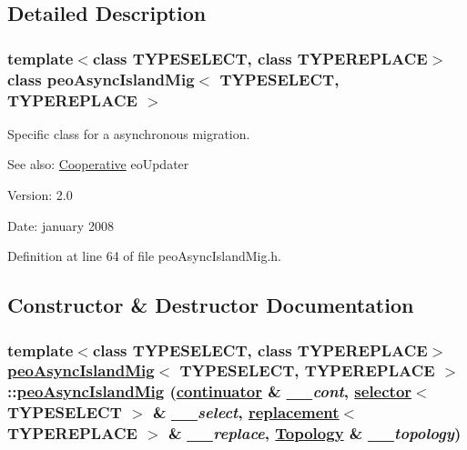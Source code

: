 \subsection{Detailed Description}
\subsubsection*{template$<$class TYPESELECT, class TYPEREPLACE$>$ class peo\-Async\-Island\-Mig$<$ TYPESELECT, TYPEREPLACE $>$}

Specific class for a asynchronous migration. 

\begin{Desc}
\item[See also:]\hyperlink{classCooperative}{Cooperative} eo\-Updater \end{Desc}
\begin{Desc}
\item[Version:]2.0 \end{Desc}
\begin{Desc}
\item[Date:]january 2008 \end{Desc}




Definition at line 64 of file peo\-Async\-Island\-Mig.h.

\subsection{Constructor \& Destructor Documentation}
\hypertarget{classpeoAsyncIslandMig_e40ddd54734b018ab4e5c3f2bbd5a49c}{
\subsubsection[peoAsyncIslandMig]{\setlength{\rightskip}{0pt plus 5cm}template$<$class TYPESELECT, class TYPEREPLACE$>$ \hyperlink{classpeoAsyncIslandMig}{peo\-Async\-Island\-Mig}$<$ TYPESELECT, TYPEREPLACE $>$::\hyperlink{classpeoAsyncIslandMig}{peo\-Async\-Island\-Mig} (\hyperlink{classcontinuator}{continuator} \& {\em \_\-\_\-cont}, \hyperlink{classselector}{selector}$<$ TYPESELECT $>$ \& {\em \_\-\_\-select}, \hyperlink{classreplacement}{replacement}$<$ TYPEREPLACE $>$ \& {\em \_\-\_\-replace}, \hyperlink{classTopology}{Topology} \& {\em \_\-\_\-topology})}}
\label{classpeoAsyncIslandMig_e40ddd54734b018ab4e5c3f2bbd5a49c}


